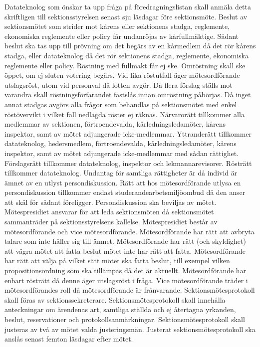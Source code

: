 \documentclass[a4paper]{dteklag}
\begin{document}
\para[Motion] Datateknolog som önskar ta upp fråga på föredragningslistan skall anmäla detta skriftligen till sektionsstyrelsen senast sju läsdagar före sektionsmöte.
\para[Överklagande] Beslut av sektionsmötet som strider mot kårens eller sektionens stadga, reglemente, ekonomiska reglemente eller policy får undanröjas av kårfullmäktige.
\stycke Sådant beslut ska tas upp till prövning om det begärs av en kårmedlem då det rör kårens stadga, eller datateknolog då det rör sektionens stadga, reglemente, ekonomiska reglemente eller policy.
\para[Omröstning] Röstning med fullmakt får ej ske.
\para Omröstning skall ske öppet, om ej sluten votering begärs.
\para Vid lika röstutfall äger mötesordförande utslagsröst, utom vid personval då lotten avgör.
\para Då flera förslag ställs mot varandra skall röstningsförfarandet fastslås innan omröstning påbörjas.
\para Då inget annat stadgas avgörs alla frågor som behandlas på sektionsmötet med enkel röstövervikt i vilket fall nedlagda röster ej räknas.
\para[Rättigheter] Närvarorätt tillkommer alla medlemmar av sektionen, förtroendevalda, kårledningsledamöter, kårens inspektor, samt av mötet adjungerade icke-medlemmar.
\para Yttranderätt tillkommer datateknolog, hedersmedlem, förtroendevalda, kårledningsledamöter, kårens inspektor, samt av mötet adjungerade icke-medlemmar med sådan rättighet.
\para Förslagsrätt tillkommer datateknolog, inspektor och lekmannarevisorer.
\para Rösträtt tillkommer datateknolog.
\para[Persondiskussion] Undantag för samtliga rättigheter är då individ är ämnet av en utlyst persondiskussion.
\para Rätt att hos mötesordförande utlysa en persondiskussion tillkommer endast studerandearbetsmiljöombud då den anser att skäl för sådant föreligger.
\stycke Persondiskussion ska beviljas av mötet.
\para[Mötespresidium] Mötespresidiet ansvarar för att leda sektionsmöten då sektionsmötet sammanträder på sektionsstyrelsens kallelse.
\para Mötespresidiet består av mötesordförande och vice mötesordförande.
\para Mötesordförande har rätt att avbryta talare som inte håller sig till ämnet.
\para Mötesordförande har rätt (och skyldighet) att vägra mötet att fatta beslut mötet inte har rätt att fatta.
\para Mötesordförande har rätt att välja på vilket sätt mötet ska fatta beslut, till exempel vilken propositionsordning som ska tillämpas då det är aktuellt.
\para Mötesordförande har enbart rösträtt då denne äger utslagsröst i fråga.
\para Vice mötesordförande träder i mötesordförandes roll då mötesordförande är frånvarande.
\para[Protokollförande] Sektionsmötesprotokoll skall föras av sektionssekreterare.
\para Sektionsmötesprotokoll skall innehålla anteckningar om ärendenas art, samtliga ställda och ej återtagna yrkanden, beslut, reservationer och protokollsanmärkningar.
\para Sektionsmötesprotokoll skall justeras av två av mötet valda justeringsmän.
\para Justerat sektionsmötesprotokoll ska anslås senast femton läsdagar efter mötet.
\end{document}
